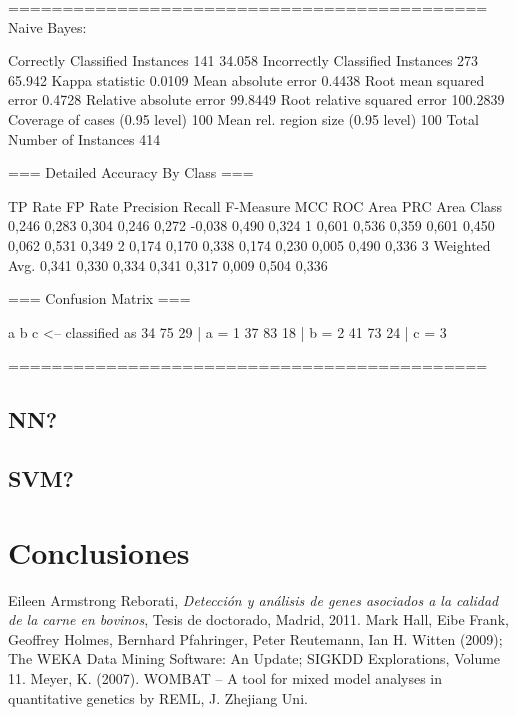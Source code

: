 \documentclass[12pt,a4paper,titlepage]{report}
\begin{document}
============================================\\
Naive Bayes:
	
Correctly Classified Instances         141               34.058  %
Incorrectly Classified Instances       273               65.942  %
Kappa statistic                          0.0109
Mean absolute error                      0.4438
Root mean squared error                  0.4728
Relative absolute error                 99.8449 %
Root relative squared error            100.2839 %
Coverage of cases (0.95 level)         100      %
Mean rel. region size (0.95 level)     100      %
Total Number of Instances              414     

=== Detailed Accuracy By Class ===

                 TP Rate  FP Rate  Precision  Recall   F-Measure  MCC      ROC Area  PRC Area  Class
                 0,246    0,283    0,304      0,246    0,272      -0,038   0,490     0,324     1
                 0,601    0,536    0,359      0,601    0,450      0,062    0,531     0,349     2
                 0,174    0,170    0,338      0,174    0,230      0,005    0,490     0,336     3
Weighted Avg.    0,341    0,330    0,334      0,341    0,317      0,009    0,504     0,336     

=== Confusion Matrix ===

  a  b  c   <-- classified as
 34 75 29 |  a = 1
 37 83 18 |  b = 2
 41 73 24 |  c = 3

============================================\\
	
\section{NN?}
	
\section{SVM?}

\chapter{Conclusiones}






\begin{thebibliography}{99}
\begin{small}

Eileen Armstrong Reborati, \emph{Detección y análisis de genes asociados a la calidad de la carne en bovinos}, Tesis de doctorado, Madrid, 2011.
Mark Hall, Eibe Frank, Geoffrey Holmes, Bernhard Pfahringer, Peter Reutemann, Ian H. Witten (2009); The WEKA Data Mining Software: An Update; SIGKDD Explorations, Volume 11.
Meyer, K. (2007). WOMBAT – A tool for mixed model analyses in quantitative genetics by REML, J. Zhejiang Uni.

\end{small}
\end{thebibliography}
\end{document}
